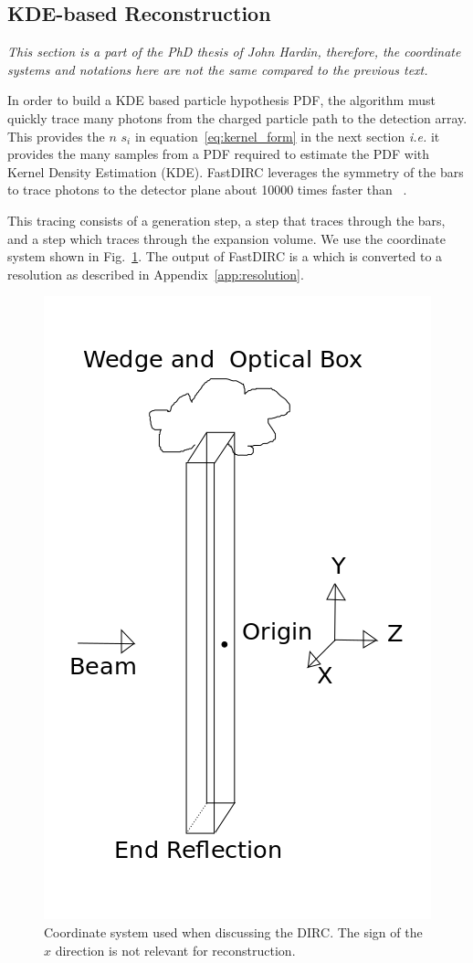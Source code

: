 \subsection{KDE-based Reconstruction}
\label{sec:kde}

\textit{This section is a part of the PhD thesis of John Hardin, therefore, the coordinate systems and notations here are not the same compared to the previous text.}

\vspace{0.5cm}

In order to build a KDE based particle hypothesis PDF, the algorithm must quickly trace many photons from the charged particle path to the detection array.  This provides the $n$ $s_{i}$ in equation~\eqref{eq:kernel_form} in the next section {\em i.e.} it provides the many samples from a PDF required to estimate the PDF with Kernel Density Estimation (KDE).  FastDIRC leverages the symmetry of the bars to trace photons to the detector plane about 10000 times faster than \geant~\cite{Hardin:2016cvu}.

This tracing consists of a generation step, a step that traces through the bars, and a step which traces through the expansion volume.  We use the coordinate system shown in Fig.~\ref{pic:coord}.  The output of FastDIRC is a \deltall which is converted to a resolution as described in Appendix~\ref{app:resolution}.

\begin{figure}[!h]
  \begin{center}
    \includegraphics[width=.35\textwidth]{pics/billi.png}
    \caption{\label{pic:coord} 
      Coordinate system used when discussing the DIRC.  The sign of the $x$ direction is not relevant for reconstruction.}
  \end{center}
\end{figure}

